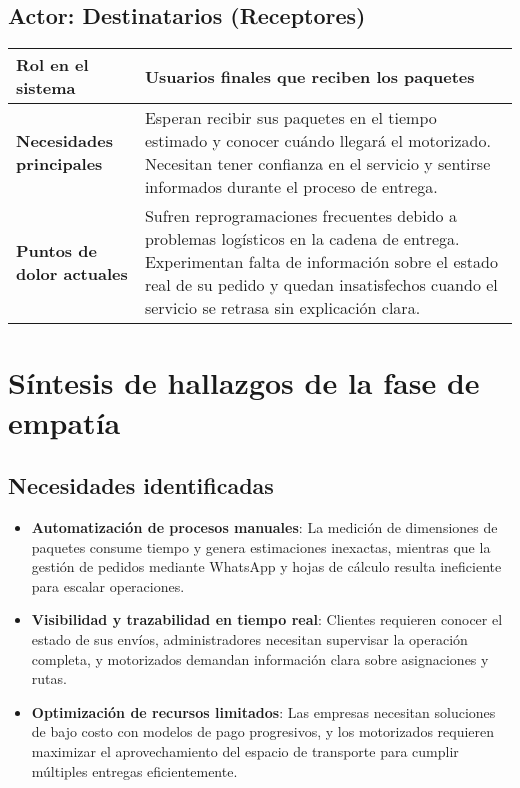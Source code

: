 \section*{Actor: Destinatarios (Receptores)}

\begin{table}[H]
\centering
\begin{tabular}{|p{4cm}|p{10cm}|}
\hline
\textbf{Rol en el sistema} & Usuarios finales que reciben los paquetes \\
\hline
\textbf{Necesidades principales} & Esperan recibir sus paquetes en el tiempo estimado y conocer cuándo llegará el motorizado. Necesitan tener confianza en el servicio y sentirse informados durante el proceso de entrega. \\
\hline
\textbf{Puntos de dolor actuales} & Sufren reprogramaciones frecuentes debido a problemas logísticos en la cadena de entrega. Experimentan falta de información sobre el estado real de su pedido y quedan insatisfechos cuando el servicio se retrasa sin explicación clara. \\
\hline
\end{tabular}
\end{table}

\chapter{Síntesis de hallazgos de la fase de empatía}
\label{anexo:hallazgos}

\section{Necesidades identificadas}

\begin{itemize}
    \item \textbf{Automatización de procesos manuales}: La medición de dimensiones de paquetes consume tiempo y genera estimaciones inexactas, mientras que la gestión de pedidos mediante WhatsApp y hojas de cálculo resulta ineficiente para escalar operaciones.
    
    \item \textbf{Visibilidad y trazabilidad en tiempo real}: Clientes requieren conocer el estado de sus envíos, administradores necesitan supervisar la operación completa, y motorizados demandan información clara sobre asignaciones y rutas.
    
    \item \textbf{Optimización de recursos limitados}: Las empresas necesitan soluciones de bajo costo con modelos de pago progresivos, y los motorizados requieren maximizar el aprovechamiento del espacio de transporte para cumplir múltiples entregas eficientemente.
\end{itemize}

